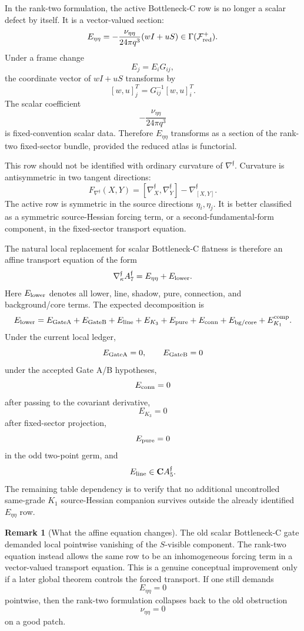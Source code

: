 \documentclass[11pt,a4paper]{amsart}
\theoremstyle{plain}
\theoremstyle{definition}
\newtheorem{remark}[theorem]{Remark}
\begin{document}
In the rank-two formulation, the active Bottleneck-C row is no longer a scalar
defect by itself.  It is a vector-valued section:
\[
E_{\eta\eta}
=
-\frac{\nu_{\eta\eta}}{24\pi q^3}(wI+uS)
\in
\Gamma(\mathcal F_{\rm red}^{+}).
\]
Under a frame change
\[
E_j=E_iG_{ij},
\]
the coordinate vector of \(wI+uS\) transforms by
\[
[w,u]_j^T
=
G_{ij}^{-1}[w,u]_i^T.
\]
The scalar coefficient
\[
-\frac{\nu_{\eta\eta}}{24\pi q^3}
\]
is fixed-convention scalar data.  Therefore \(E_{\eta\eta}\) transforms as a
section of the rank-two fixed-sector bundle, provided the reduced atlas is
functorial.

This row should not be identified with ordinary curvature of
\(\nabla^{\mathfrak f}\).  Curvature is antisymmetric in two tangent
directions:
\[
F_{\nabla^{\mathfrak f}}(X,Y)
=
[\nabla_X^{\mathfrak f},\nabla_Y^{\mathfrak f}]
-
\nabla_{[X,Y]}^{\mathfrak f}.
\]
The active row is symmetric in the source directions \(\eta_i,\eta_j\).  It is
better classified as a symmetric source-Hessian forcing term, or a
second-fundamental-form component, in the fixed-sector transport equation.

The natural local replacement for scalar Bottleneck-C flatness is therefore an
affine transport equation of the form
\[
\nabla_\kappa^{\mathfrak f}A_7^{\mathfrak f}
=
E_{\eta\eta}
+
E_{\rm lower}.
\]
Here \(E_{\rm lower}\) denotes all lower, line, shadow, pure, connection, and
background/core terms.  The expected decomposition is
\[
E_{\rm lower}
=
E_{\rm GateA}
+
E_{\rm GateB}
+
E_{\rm line}
+
E_{K_3}
+
E_{\rm pure}
+
E_{\rm conn}
+
E_{\rm bg/core}
+
E_{K_1}^{\rm comp}.
\]
Under the current local ledger,
\[
E_{\rm GateA}=0,
\qquad
E_{\rm GateB}=0
\]
under the accepted Gate A/B hypotheses,
\[
E_{\rm conn}=0
\]
after passing to the covariant derivative,
\[
E_{K_3}=0
\]
after fixed-sector projection,
\[
E_{\rm pure}=0
\]
in the odd two-point germ, and
\[
E_{\rm line}\in \mathbf C A_5^{\mathfrak f}.
\]
The remaining table dependency is to verify that no additional uncontrolled
same-grade \(K_1\) source-Hessian companion survives outside the already
identified \(E_{\eta\eta}\) row.

\begin{remark}[What the affine equation changes]
\label{rem:what-affine-equation-changes}
The old scalar Bottleneck-C gate demanded local pointwise vanishing of the
\(S\)-visible component.  The rank-two equation instead allows the same row to
be an inhomogeneous forcing term in a vector-valued transport equation.  This
is a genuine conceptual improvement only if a later global theorem controls
the forced transport.  If one still demands
\[
E_{\eta\eta}=0
\]
pointwise, then the rank-two formulation collapses back to the old obstruction
\[
\nu_{\eta\eta}=0
\]
on a good patch.
\end{remark}
\end{document}
